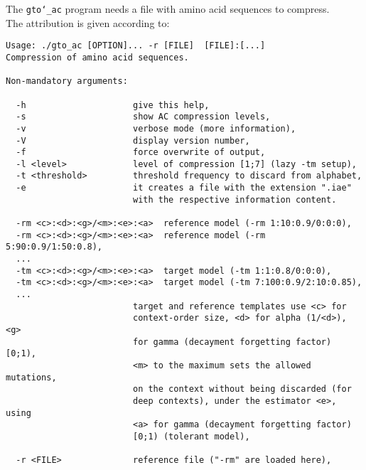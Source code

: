 The \texttt{gto\char`_ac} program needs a file with amino acid sequences to compress.\\
The attribution is given according to:
\begin{lstlisting}
Usage: ./gto_ac [OPTION]... -r [FILE]  [FILE]:[...]                          
Compression of amino acid sequences.                                   
                                                                       
Non-mandatory arguments:                                               
                                                                       
  -h                     give this help,                               
  -s                     show AC compression levels,                   
  -v                     verbose mode (more information),              
  -V                     display version number,                       
  -f                     force overwrite of output,                    
  -l <level>             level of compression [1;7] (lazy -tm setup),  
  -t <threshold>         threshold frequency to discard from alphabet,
  -e                     it creates a file with the extension ".iae" 
                         with the respective information content.      
                                                                       
  -rm <c>:<d>:<g>/<m>:<e>:<a>  reference model (-rm 1:10:0.9/0:0:0),   
  -rm <c>:<d>:<g>/<m>:<e>:<a>  reference model (-rm 5:90:0.9/1:50:0.8),
  ...                                                                  
  -tm <c>:<d>:<g>/<m>:<e>:<a>  target model (-tm 1:1:0.8/0:0:0),       
  -tm <c>:<d>:<g>/<m>:<e>:<a>  target model (-tm 7:100:0.9/2:10:0.85), 
  ...                                                                  
                         target and reference templates use <c> for    
                         context-order size, <d> for alpha (1/<d>), <g>
                         for gamma (decayment forgetting factor) [0;1),
                         <m> to the maximum sets the allowed mutations,
                         on the context without being discarded (for   
                         deep contexts), under the estimator <e>, using
                         <a> for gamma (decayment forgetting factor)   
                         [0;1) (tolerant model),                       
                                                                       
  -r <FILE>              reference file ("-rm" are loaded here),     
                                                                       

\end{lstlisting}

